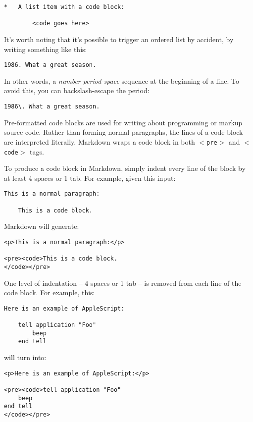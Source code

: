 \begin{verbatim}
*   A list item with a code block:

        <code goes here>
\end{verbatim}

It's worth noting that it's possible to trigger an ordered list by
accident, by writing something like this:

\begin{verbatim}
1986. What a great season.
\end{verbatim}

In other words, a \emph{number-period-space} sequence at the beginning of a
line. To avoid this, you can backslash-escape the period:

\begin{verbatim}
1986\. What a great season.
\end{verbatim}

Pre-formatted code blocks are used for writing about programming or
markup source code. Rather than forming normal paragraphs, the lines
of a code block are interpreted literally. Markdown wraps a code block
in both \texttt{$<$pre$>$} and \texttt{$<$code$>$} tags.

To produce a code block in Markdown, simply indent every line of the
block by at least 4 spaces or 1 tab. For example, given this input:

\begin{verbatim}
This is a normal paragraph:

    This is a code block.
\end{verbatim}

Markdown will generate:

\begin{verbatim}
<p>This is a normal paragraph:</p>

<pre><code>This is a code block.
</code></pre>
\end{verbatim}

One level of indentation -- 4 spaces or 1 tab -- is removed from each
line of the code block. For example, this:

\begin{verbatim}
Here is an example of AppleScript:

    tell application "Foo"
        beep
    end tell
\end{verbatim}

will turn into:

\begin{verbatim}
<p>Here is an example of AppleScript:</p>

<pre><code>tell application "Foo"
    beep
end tell
</code></pre>
\end{verbatim}

